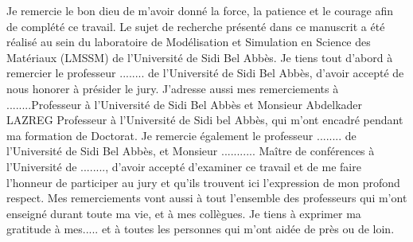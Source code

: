 \documentclass[
12pt, %
english, %
doublespacing,
headsepline, %
]{MastersDoctoralThesis} %
\begin{document}
Je remercie le bon dieu de m’avoir donné la force, la patience et le courage afin de complété ce travail. Le sujet de recherche présenté dans ce manuscrit a été réalisé au sein du laboratoire de Modélisation et Simulation en Science des Matériaux (LMSSM) de l’Université de Sidi Bel Abbès. Je tiens tout d’abord à remercier le professeur ........ de l’Université de Sidi Bel Abbès, d’avoir accepté de nous honorer à présider le jury. J’adresse aussi mes remerciements à ........Professeur à l’Université de Sidi Bel Abbès et Monsieur Abdelkader LAZREG Professeur à l’Université de Sidi bel Abbès, qui m’ont encadré pendant ma formation de Doctorat. Je remercie également le professeur ........ de l’Université de Sidi Bel Abbès, et Monsieur ........... Maître de conférences à l’Université de ........, d’avoir accepté d’examiner ce travail et de me faire l’honneur de participer au jury et qu’ils trouvent ici l’expression de mon profond respect. Mes remerciements vont aussi à tout l'ensemble des professeurs qui m'ont enseigné durant toute ma vie, et à mes collègues. Je tiens à exprimer ma gratitude à mes..... et à toutes les personnes qui m'ont aidée de près ou de loin.


\mainmatter %

\pagestyle{thesis} %



 

 



\appendix %


%
%
%

\printbibliography[heading=bibintoc]

\end{document}
